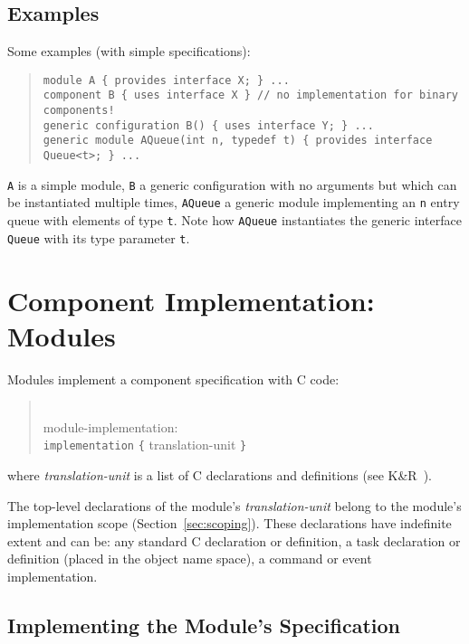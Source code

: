 \documentclass[11pt,letterpaper]{article}
\newcommand{\kw}[1]{{\tt #1}}
\newcommand{\code}[1]{{\tt #1}}
\newcommand{\grammarshift}{\vspace*{-.7cm}}
\newcommand{\grammarindent}{\hspace*{2cm}\= \\ \kill}
\begin{document}
\subsection{Examples}

Some examples (with simple specifications):
\begin{quote}
\begin{verbatim}
module A { provides interface X; } ...
component B { uses interface X } // no implementation for binary components!
generic configuration B() { uses interface Y; } ...
generic module AQueue(int n, typedef t) { provides interface Queue<t>; } ...
\end{verbatim}
\end{quote}
\code{A} is a simple module, \code{B} a generic configuration with no
arguments but which can be instantiated multiple times, \code{AQueue}
a generic module implementing an \code{n} entry queue with elements of
type \code{t}. Note how \code{AQueue} instantiates the generic interface
\code{Queue} with its type parameter \code{t}.

\section{Component Implementation: Modules}
\label{sec:module}

Modules implement a component specification with C code:
\begin{quote} \grammarshift \em \begin{tabbing}
\grammarindent
module-implementation:\\
\>	\kw{implementation} \kw{\{} translation-unit \kw{\}}\\
\end{tabbing} \end{quote}
where \emph{translation-unit} is a list of C declarations and definitions
(see K\&R~\cite[pp234--239]{kandr}). 

The top-level declarations of the module's \emph{translation-unit} belong
to the module's implementation scope (Section~\ref{sec:scoping}). These
declarations have indefinite extent and can be: any standard C declaration
or definition, a task declaration or definition (placed in the object name
space), a command or event implementation.

\subsection{Implementing the Module's Specification}
\end{document}
